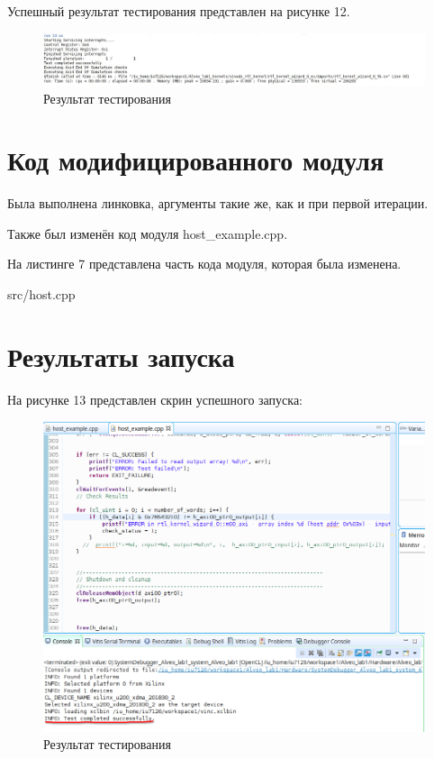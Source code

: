 Успешный результат тестирования представлен на рисунке 12.

\FloatBarrier
\begin{figure}[h]
	\begin{center}
		\includegraphics[width=\linewidth]{inc/test_completed.png}
	\end{center}
	\caption{Результат тестирования}
\end{figure}
\FloatBarrier

\section*{Код модифицированного модуля}
Была выполнена линковка, аргументы такие же, как и при первой итерации.

Также был изменён код модуля host\_example.cpp.

На листинге 7 представлена часть кода модуля, которая была изменена.
\begin{lstinputlisting}[language=C++, caption=Изменённый код модуля host\_example.cpp, 
	basicstyle=\footnotesize\ttfamily, frame=single,breaklines=true]{src/host.cpp}
\end{lstinputlisting}

\section*{Результаты запуска}
На рисунке 13 представлен скрин успешного запуска:

\FloatBarrier
\begin{figure}[h]
	\begin{center}
		\includegraphics[width=\linewidth]{inc/final_result.png}
	\end{center}
	\caption{Результат тестирования}
\end{figure}
\FloatBarrier

